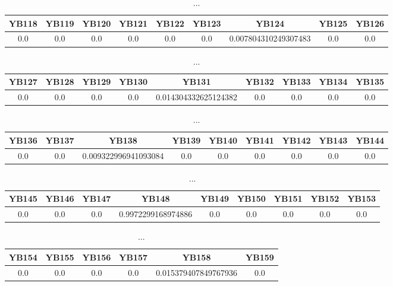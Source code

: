 \documentclass[]{article}
\begin{document}
\begin{table}[h]
      \centering
      \begin{tabular}{|c|c|c|c|c|c|c|c|c|}
            \hline
            YB118 & YB119 & YB120 & YB121 & YB122 & YB123 & YB124                & YB125 & YB126 \\
            \hline
            0.0   & 0.0   & 0.0   & 0.0   & 0.0   & 0.0   & 0.007804310249307483 & 0.0   & 0.0   \\
            \hline
      \end{tabular}
      \caption{...}
\end{table}
\begin{table}[h]
      \centering
      \begin{tabular}{|c|c|c|c|c|c|c|c|c|}
            \hline
            YB127 & YB128 & YB129 & YB130 & YB131                & YB132 & YB133 & YB134 & YB135 \\
            \hline
            0.0   & 0.0   & 0.0   & 0.0   & 0.014304332625124382 & 0.0   & 0.0   & 0.0   & 0.0   \\
            \hline
      \end{tabular}
      \caption{...}
\end{table}
\begin{table}[h]
      \centering
      \begin{tabular}{|c|c|c|c|c|c|c|c|c|}
            \hline
            YB136 & YB137 & YB138                & YB139 & YB140 & YB141 & YB142 & YB143 & YB144 \\
            \hline
            0.0   & 0.0   & 0.009322996941093084 & 0.0   & 0.0   & 0.0   & 0.0   & 0.0   & 0.0   \\
            \hline
      \end{tabular}
      \caption{...}
\end{table}
\begin{table}[h]
      \centering
      \begin{tabular}{|c|c|c|c|c|c|c|c|c|}
            \hline
            YB145 & YB146 & YB147 & YB148              & YB149 & YB150 & YB151 & YB152 & YB153 \\
            \hline
            0.0   & 0.0   & 0.0   & 0.9972299168974886 & 0.0   & 0.0   & 0.0   & 0.0   & 0.0   \\
            \hline
      \end{tabular}
      \caption{...}
\end{table}
\begin{table}[h]
      \centering
      \begin{tabular}{|c|c|c|c|c|c|}
            \hline
            YB154 & YB155 & YB156 & YB157 & YB158                & YB159 \\
            \hline
            0.0   & 0.0   & 0.0   & 0.0   & 0.015379407849767936 & 0.0   \\
            \hline
      \end{tabular}
      \caption{...}
\end{table}
\end{document}
